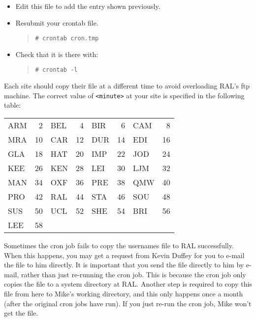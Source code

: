\begin{itemize}
\begin{itemize}
\item Edit this file to add the entry shown previously.

\item Resubmit your crontab file.
\begin{quote}
{\tt \# crontab cron.tmp}
\end{quote}

\item Check that it is there with:
\begin{quote}
{\tt \# crontab -l}
\end{quote}

\end{itemize}
\end{itemize}

Each site should copy their file at a different time to avoid overloading
RAL's ftp machine.
The correct value of {\tt <minute>} at your site is specified in the following
table:

\begin{table}[ht]
\begin{center}
\begin{tabular}{||lr|lr|lr|lr||} 	\hline
ARM &  2 & BEL &  4 & BIR &  6 & CAM &  8 \\
MRA & 10 & CAR & 12 & DUR & 14 & EDI & 16 \\
GLA & 18 & HAT & 20 & IMP & 22 & JOD & 24 \\
KEE & 26 & KEN & 28 & LEI & 30 & LJM & 32 \\
MAN & 34 & OXF & 36 & PRE & 38 & QMW & 40 \\
PRO & 42 & RAL & 44 & STA & 46 & SOU & 48 \\
SUS & 50 & UCL & 52 & SHE & 54 & BRI & 56 \\
LEE & 58 &     &    &     &    &     &    \\
\hline
\end{tabular}
\end{center}
\end{table}

Sometimes the cron job fails to copy the usernames file to RAL successfully.
When this happens, you may get a request from Kevin Duffey for you to
e-mail the file to him directly.
It is important that you send the file directly to him by e-mail, rather than
just re-running the cron job.
This is because the cron job only copies the file to a system directory at
RAL.
Another step is required to copy this file from here to Mike's working
directory, and this only happens once a month (after the original cron jobs
have run).
If you just re-run the cron job, Mike won't get the file.


